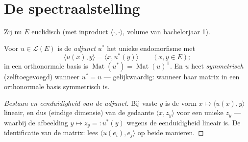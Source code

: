 \section{De spectraalstelling}

Zij nu $E$ euclidisch (met inproduct $\langle\cdot,\cdot\rangle$,
volume van bachelorjaar 1).

\begin{definition}\label{def:b2:quadratic:adjoint}
Voor $u \in \mathcal{L}(E)$ is de \emph{adjunct}
$u^*$ het unieke endomorfisme met
\[
\langle u(x), y\rangle = \langle x, u^*(y)\rangle
\qquad (x, y \in E);
\]
in een orthonormale basis is $\operatorname{Mat}(u^*) =
\operatorname{Mat}(u)^{\mathsf T}$. En $u$ heet
\emph{symmetrisch}
(zelftoegevoegd) wanneer $u^* = u$ --- gelijkwaardig: wanneer haar
matrix in een orthonormale basis symmetrisch is.
\end{definition}

\begin{proof}[Bestaan en eenduidigheid van de adjunct]
Bij vaste $y$ is de vorm $x \mapsto \langle u(x), y\rangle$
lineair, en dus (eindige dimensie) van de gedaante $\langle x,
z_y\rangle$ voor een unieke $z_y$ --- waarbij de afbeelding $y
\mapsto z_y =: u^*(y)$ wegens de eenduidigheid lineair is. De
identificatie van de matrix: lees $\langle u(e_i), e_j\rangle$ op
beide manieren.
\end{proof}

